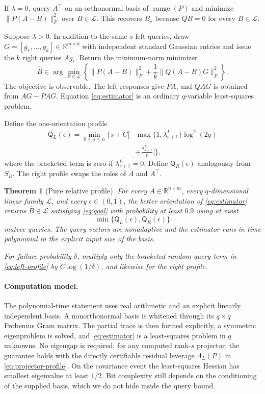 \documentclass[twoside]{article}
\newtheorem{theorem}{Theorem}
\newcommand{\R}{\mathbb R}
\newcommand{\cL}{\mathcal L}
\begin{document}
If $\lambda=0$, query $A^\top$ on an orthonormal basis of $\operatorname{range}(P)$ and minimize $\|P(A-B)\|_F^2$ over $B\in\cL$. This recovers $B_\star$ because $QB=0$ for every $B\in\cL$.

Suppose $\lambda>0$. In addition to the same $s$ left queries, draw $G=[g_1,\ldots,g_k]\in\R^{m\times k}$ with independent standard Gaussian entries and issue the $k$ right queries $Ag_\ell$. Return the minimum-norm minimizer
\begin{equation}
 \widehat B\in\arg\min_{B\in\cL}
 \left\{
 \|P(A-B)\|_F^2+\frac1k\|Q(A-B)G\|_F^2
 \right\}.
 \label{eq:estimator}
\end{equation}
The objective is observable. The left responses give $PA$, and $QAG$ is obtained from $AG-PAG$. Equation \eqref{eq:estimator} is an ordinary $q$-variable least-squares problem.

Define the one-orientation profile
\begin{equation}
 \begin{aligned}
 \mathsf Q_L(\epsilon)=\min_{0\le s\le n}\biggl\{s+C\biggl[
 &\max\{1,\lambda_{s+1}^L\}\log^2(2q)\\
 &+\frac{\lambda_{s+1}^L}{\epsilon}
 \biggr]\biggr\},
 \end{aligned}
 \label{eq:left-profile}
\end{equation}
where the bracketed term is zero if $\lambda_{s+1}^L=0$. Define $\mathsf Q_R(\epsilon)$ analogously from $S_R$. The right profile swaps the roles of $A$ and $A^\top$.

\begin{theorem}[Pure relative profile]
\label{thm:profile}
For every $A\in\R^{n\times m}$, every $q$-dimensional linear family $\cL$, and every $\epsilon\in(0,1)$, the better orientation of \eqref{eq:estimator} returns $\widehat B\in\cL$ satisfying \eqref{eq:goal} with probability at least $0.9$ using at most \[ \min\{\mathsf Q_L(\epsilon),\mathsf Q_R(\epsilon)\} \] matvec queries. The query vectors are nonadaptive and the estimator runs in time polynomial in the explicit input size of the basis.

For failure probability $\delta$, multiply only the bracketed random-query term in \eqref{eq:left-profile} by $C\log(1/\delta)$, and likewise for the right profile.
\end{theorem}

\paragraph{Computation model.}
The polynomial-time statement uses real arithmetic and an explicit linearly independent basis. A nonorthonormal basis is whitened through its $q\times q$ Frobenius Gram matrix. The partial trace is then formed explicitly, a symmetric eigenproblem is solved, and \eqref{eq:estimator} is a least-squares problem in $q$ unknowns. No eigengap is required: for any computed rank-$s$ projector, the guarantee holds with the directly certifiable residual leverage $\Lambda_L(P)$ in \eqref{eq:projector-profile}. On the covariance event the least-squares Hessian has smallest eigenvalue at least $1/2$. Bit complexity still depends on the conditioning of the supplied basis, which we do not hide inside the query bound.
\end{document}
